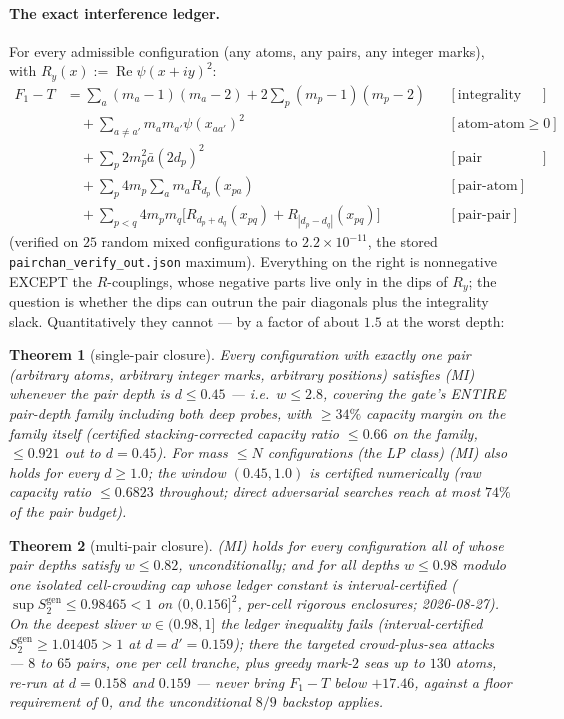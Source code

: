 \documentclass[11pt]{article}
\theoremstyle{plain}
\newtheorem{theorem}{Theorem}[section]
\theoremstyle{definition}
\theoremstyle{remark}
\newcommand{\Sgen}{S^{\mathrm{gen}}_{2}}
\begin{document}
\paragraph{The exact interference ledger.}
For every admissible configuration (any atoms, any pairs, any integer marks),
with $R_y(x) := \operatorname{Re} \psi(x + iy)^2$:
\begin{align*}
  F_1 - T
  &= \sum_a (m_a - 1)(m_a - 2) + 2 \sum_p (m_p - 1)(m_p - 2)
    && [\text{integrality slack}]\\
  &\quad + \sum_{a \ne a'} m_a m_{a'} \psi(x_{aa'})^2
    && [\text{atom-atom} \ge 0]\\
  &\quad + \sum_p 2 m_p^2 \bar{a}(2 d_p)^2
    && [\text{pair diagonals}]\\
  &\quad + \sum_p 4 m_p \sum_a m_a R_{d_p}(x_{pa})
    && [\text{pair-atom}]\\
  &\quad + \sum_{p < q} 4 m_p m_q
      \bigl[ R_{d_p + d_q}(x_{pq}) + R_{|d_p - d_q|}(x_{pq}) \bigr]
    && [\text{pair-pair}]
\end{align*}
(verified on $25$ random mixed configurations to $2.2 \times 10^{-11}$, the
stored \texttt{pairchan\_verify\_out.json} maximum). Everything on the right is
nonnegative EXCEPT the $R$-couplings, whose negative parts live only in the dips
of $R_y$; the question is whether the dips can outrun the pair diagonals plus the
integrality slack. Quantitatively they cannot --- by a factor of about $1.5$ at
the worst depth:

\begin{theorem}[single-pair closure]
\label{thm:singlepair}
Every configuration with exactly one pair (arbitrary atoms, arbitrary integer
marks, arbitrary positions) satisfies (MI) whenever the pair depth is
$d \le 0.45$ --- i.e.\ $w \le 2.8$, covering the gate's ENTIRE pair-depth family
including both deep probes, with $\ge 34\%$ capacity margin on the family itself
(certified stacking-corrected capacity ratio $\le 0.66$ on the family,
$\le 0.921$ out to $d = 0.45$). For mass $\le N$ configurations (the LP class)
(MI) also holds for every $d \ge 1.0$; the window $(0.45, 1.0)$ is certified
numerically (raw capacity ratio $\le 0.6823$ throughout; direct adversarial
searches reach at most $74\%$ of the pair budget).
\end{theorem}

\begin{theorem}[multi-pair closure]
\label{thm:multipair}
(MI) holds for every configuration all of whose pair depths satisfy
$w \le 0.82$, unconditionally; and for all depths $w \le 0.98$ modulo one
isolated cell-crowding cap whose ledger constant is interval-certified
($\sup \Sgen \le 0.98465 < 1$ on $(0, 0.156]^2$, per-cell rigorous enclosures;
2026-08-27). On the deepest sliver $w \in (0.98, 1]$ the ledger inequality fails
(interval-certified $\Sgen \ge 1.01405 > 1$ at $d = d' = 0.159$); there the
targeted crowd-plus-sea attacks --- $8$ to $65$ pairs, one per cell tranche, plus
greedy mark-$2$ seas up to $130$ atoms, re-run at $d = 0.158$ and $0.159$ ---
never bring $F_1 - T$ below $+17.46$, against a floor requirement of $0$, and the
unconditional $8/9$ backstop applies.
\end{theorem}
\end{document}
